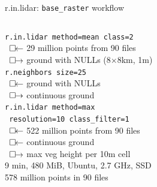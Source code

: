 \documentclass[xcolor={dvipsnames,usenames},beamer,aspectratio=169]{beamer}
\begin{document}
\begin{frame}{r.in.lidar: \texttt{base\_raster} workflow}

\begin{columns}
\begin{column}{0.45\textwidth}

\texttt{r.in.lidar method=mean class=2}\\
\ $\square\hspace{-4pt}\leftarrow$ 29 million points from 90 files\\
\ $\square\hspace{-4pt}\rightarrow$ ground with NULLs (8$\times$8km, 1m)\\

\texttt{r.neighbors size=25}\\
\ $\square\hspace{-4pt}\leftarrow$ ground with NULLs\\
\ $\square\hspace{-4pt}\rightarrow$ continuous ground\\

\texttt{r.in.lidar method=max\\\ resolution=10 class\_filter=1}\\
\ $\square\hspace{-4pt}\leftarrow$ 522 million points from 90 files\\
\ $\square\hspace{-4pt}\leftarrow$ continuous ground\\
\ $\square\hspace{-4pt}\rightarrow$ max veg height per 10m cell\\

\medskip
\footnotesize
9 min, 480 MiB, Ubuntu, 2.7 GHz, SSD
\\
578 million points in 90 files

\end{column}
\begin{column}{0.45\textwidth}


\end{column}
\end{columns}
\end{frame}
\end{document}
